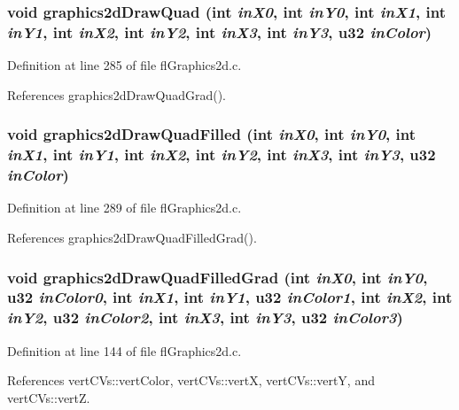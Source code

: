 \subsubsection{\setlength{\rightskip}{0pt plus 5cm}void graphics2d\-Draw\-Quad (int {\em in\-X0}, int {\em in\-Y0}, int {\em in\-X1}, int {\em in\-Y1}, int {\em in\-X2}, int {\em in\-Y2}, int {\em in\-X3}, int {\em in\-Y3}, u32 {\em in\-Color})}\label{flGraphics2d_8h_c1d2e699b20f3d9ae7239f6785f43ba8}




Definition at line 285 of file fl\-Graphics2d.c.

References graphics2d\-Draw\-Quad\-Grad().
\subsubsection{\setlength{\rightskip}{0pt plus 5cm}void graphics2d\-Draw\-Quad\-Filled (int {\em in\-X0}, int {\em in\-Y0}, int {\em in\-X1}, int {\em in\-Y1}, int {\em in\-X2}, int {\em in\-Y2}, int {\em in\-X3}, int {\em in\-Y3}, u32 {\em in\-Color})}\label{flGraphics2d_8h_d3af9c2ef1e8251493b8b15a6bdb7583}




Definition at line 289 of file fl\-Graphics2d.c.

References graphics2d\-Draw\-Quad\-Filled\-Grad().
\subsubsection{\setlength{\rightskip}{0pt plus 5cm}void graphics2d\-Draw\-Quad\-Filled\-Grad (int {\em in\-X0}, int {\em in\-Y0}, u32 {\em in\-Color0}, int {\em in\-X1}, int {\em in\-Y1}, u32 {\em in\-Color1}, int {\em in\-X2}, int {\em in\-Y2}, u32 {\em in\-Color2}, int {\em in\-X3}, int {\em in\-Y3}, u32 {\em in\-Color3})}\label{flGraphics2d_8h_cd1c14a7dd6e330988bc27e99f90dd95}




Definition at line 144 of file fl\-Graphics2d.c.

References vert\-CVs::vert\-Color, vert\-CVs::vert\-X, vert\-CVs::vert\-Y, and vert\-CVs::vert\-Z.


